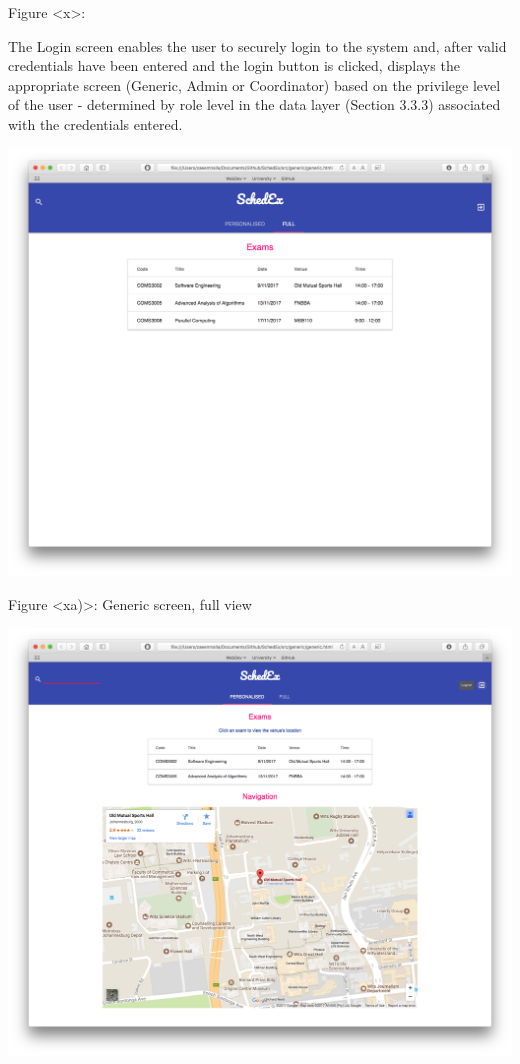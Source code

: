 \documentclass{article}
\begin{document}
Figure <x>: 

The Login screen enables the user to securely login to the system and, after valid credentials have been entered and the login button is clicked,  displays the appropriate screen (Generic, Admin or Coordinator) based on the privilege level of the user - determined by role level in the data layer (Section 3.3.3) associated with the credentials entered.   

\centerline{\includegraphics[scale=0.4]{generic_full}}

Figure <xa)>: Generic screen, full view

\centerline{\includegraphics[scale=0.4]{generic_personalised}}
\end{document}
